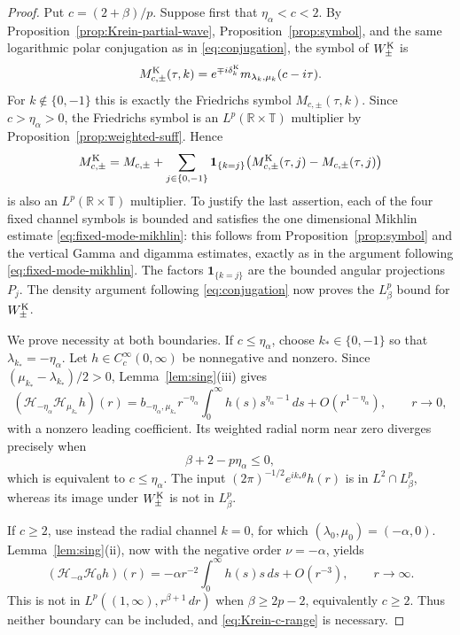 \documentclass[11pt,a4paper,reqno,backref=page]{amsart}
\newcommand{\R}{\mathbb R}
\newcommand{\T}{\mathbb T}
\newcommand{\HH}{\mathcal H}                 %
\newcommand{\ind}{\mathbf 1}
\newcommand{\dd}{\,d}
\numberwithin{equation}{section}
\theoremstyle{definition}
\theoremstyle{remark}
\begin{document}
\begin{proof}
Put $c=(2+\beta)/p$. Suppose first that $\eta_\alpha<c<2$. By
Proposition~\ref{prop:Krein-partial-wave},
Proposition~\ref{prop:symbol}, and the same logarithmic polar
conjugation as in \eqref{eq:conjugation}, the symbol of
$W_\pm^{\rm K}$ is
\begin{equation}\label{eq:Krein-multiplier}
  M_{c,\pm}^{\rm K}(\tau,k)
  =e^{\mp i\delta_k^{\rm K}}m_{\lambda_k,\mu_k}(c-i\tau).
\end{equation}
For $k\notin\{0,-1\}$ this is exactly the Friedrichs symbol
$M_{c,\pm}(\tau,k)$. Since $c>\eta_\alpha>0$, the Friedrichs
symbol is an $L^p(\R\times\T)$ multiplier by
Proposition~\ref{prop:weighted-suff}. Hence
\begin{equation*}
  M_{c,\pm}^{\rm K}=M_{c,\pm}
  +\sum_{j\in\{0,-1\}}\ind_{\{k=j\}}
  \bigl(M_{c,\pm}^{\rm K}(\tau,j)-M_{c,\pm}(\tau,j)\bigr)
\end{equation*}
is also an $L^p(\R\times\T)$ multiplier. To justify the last
assertion, each of the four fixed channel symbols is bounded and
satisfies the one dimensional Mikhlin estimate
\eqref{eq:fixed-mode-mikhlin}: this follows from
Proposition~\ref{prop:symbol} and the vertical Gamma and digamma
estimates, exactly as in the argument following
\eqref{eq:fixed-mode-mikhlin}. The factors $\ind_{\{k=j\}}$ are
the bounded angular projections $P_j$. The density argument
following \eqref{eq:conjugation} now proves the $L^p_\beta$
bound for $W_\pm^{\rm K}$.

We prove necessity at both boundaries. If $c\le\eta_\alpha$,
choose $k_*\in\{0,-1\}$ so that $\lambda_{k_*}=-\eta_\alpha$.
Let $h\in C_c^\infty(0,\infty)$ be nonnegative and nonzero.
Since $(\mu_{k_*}-\lambda_{k_*})/2>0$, Lemma~\ref{lem:sing}(iii)
gives
\begin{equation}\label{eq:Krein-origin-asymptotic}
  (\HH_{-\eta_\alpha}\HH_{\mu_{k_*}}h)(r)
  =b_{-\eta_\alpha,\mu_{k_*}}r^{-\eta_\alpha}
  \int_0^\infty h(s)s^{\eta_\alpha-1}\dd s
  +O(r^{1-\eta_\alpha}),
  \qquad r\to0,
\end{equation}
with a nonzero leading coefficient. Its weighted radial norm
near zero diverges precisely when
\begin{equation*}
  \beta+2-p\eta_\alpha\le0,
\end{equation*}
which is equivalent to $c\le\eta_\alpha$. The input
$(2\pi)^{-1/2}e^{ik_*\theta}h(r)$ is in $L^2\cap L^p_\beta$,
whereas its image under $W_\pm^{\rm K}$ is not in $L^p_\beta$.

If $c\ge2$, use instead the radial channel $k=0$, for which
$(\lambda_0,\mu_0)=(-\alpha,0)$. Lemma~\ref{lem:sing}(ii), now
with the negative order $\nu=-\alpha$, yields
\begin{equation}\label{eq:Krein-tail}
  (\HH_{-\alpha}\HH_0h)(r)
  =-\alpha r^{-2}\int_0^\infty h(s)s\dd s+O(r^{-3}),
  \qquad r\to\infty.
\end{equation}
This is not in $L^p((1,\infty),r^{\beta+1}\,dr)$ when
$\beta\ge2p-2$, equivalently $c\ge2$. Thus neither boundary can
be included, and \eqref{eq:Krein-c-range} is necessary.
\end{proof}
\end{document}
